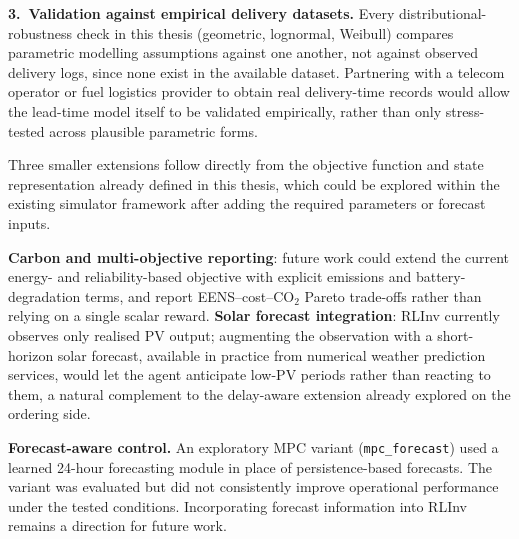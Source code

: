 \textbf{3.\ Validation against empirical delivery datasets.} Every
distributional-robustness check in this thesis (geometric, lognormal,
Weibull) compares parametric modelling assumptions against one another,
not against observed delivery logs, since none exist in the available
dataset. Partnering with a telecom operator or fuel logistics provider
to obtain real delivery-time records would allow the lead-time model
itself to be validated empirically, rather than only stress-tested
across plausible parametric forms.

\begin{sloppypar}

Three smaller extensions follow directly from the objective function and
state representation already defined in this thesis, which could be
explored within the existing simulator framework after adding the
required parameters or forecast inputs. 
\end{sloppypar}
\textbf{Carbon and multi-objective
reporting}: future work could extend the current energy- and
reliability-based objective with explicit emissions and
battery-degradation terms, and report EENS--cost--CO$_2$ Pareto
trade-offs rather than relying on a single scalar reward. \textbf{Solar forecast integration}: RLInv
currently observes only realised PV output; augmenting the observation
with a short-horizon solar forecast, available in practice from
numerical weather prediction services, would let the agent anticipate
low-PV periods rather than reacting to them, a natural complement to
the delay-aware extension already explored on the ordering side.

\textbf{Forecast-aware control.}
An exploratory MPC variant (\texttt{mpc\_forecast})
used a learned 24-hour forecasting module in place
of persistence-based forecasts. The variant was
evaluated but did not consistently improve
operational performance under the tested conditions.
Incorporating forecast information into RLInv
remains a direction for future work.



